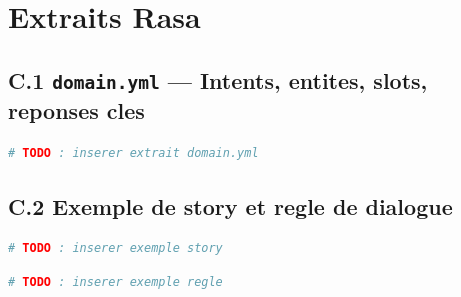 \chapter{Extraits Rasa}

\section*{C.1 \texttt{domain.yml} — Intents, entites, slots, reponses cles}

\begin{lstlisting}[language=bash, caption={domain.yml -- Extrait partiel}]
# TODO : inserer extrait domain.yml
\end{lstlisting}

\section*{C.2 Exemple de story et regle de dialogue}

\begin{lstlisting}[language=bash, caption={stories.yml -- Exemple de story}]
# TODO : inserer exemple story
\end{lstlisting}

\begin{lstlisting}[language=bash, caption={rules.yml -- Exemple de regle}]
# TODO : inserer exemple regle
\end{lstlisting}
